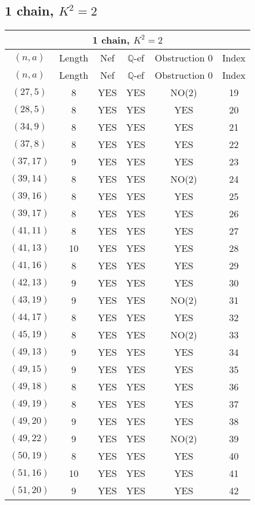 \subsection{1 chain, $K^2 = 2$}
\begin{longtable}{|c|c|c|c|c|c|}
\hline
\multicolumn{6}{|c|}{1 chain, $K^2 = 2$}\\
\hline
$(n,a)$ & Length & Nef & $\mathbb Q$-ef & Obstruction 0 & Index\\
\hline
\endfirsthead

\hline
$(n,a)$ & Length & Nef & $\mathbb Q$-ef & Obstruction 0 & Index\\
\hline
\endhead
\hline
\endfoot

$(27, 5)$ & 8 & YES & YES & NO(2) & 19\\
$(28, 5)$ & 8 & YES & YES & YES & 20\\
$(34, 9)$ & 8 & YES & YES & YES & 21\\
$(37, 8)$ & 8 & YES & YES & YES & 22\\
$(37, 17)$ & 9 & YES & YES & YES & 23\\
$(39, 14)$ & 8 & YES & YES & NO(2) & 24\\
$(39, 16)$ & 8 & YES & YES & YES & 25\\
$(39, 17)$ & 8 & YES & YES & YES & 26\\
$(41, 11)$ & 8 & YES & YES & YES & 27\\
$(41, 13)$ & 10 & YES & YES & YES & 28\\
$(41, 16)$ & 8 & YES & YES & YES & 29\\
$(42, 13)$ & 9 & YES & YES & YES & 30\\
$(43, 19)$ & 9 & YES & YES & NO(2) & 31\\
$(44, 17)$ & 8 & YES & YES & YES & 32\\
$(45, 19)$ & 8 & YES & YES & NO(2) & 33\\
$(49, 13)$ & 9 & YES & YES & YES & 34\\
$(49, 15)$ & 9 & YES & YES & YES & 35\\
$(49, 18)$ & 8 & YES & YES & YES & 36\\
$(49, 19)$ & 8 & YES & YES & YES & 37\\
$(49, 20)$ & 9 & YES & YES & YES & 38\\
$(49, 22)$ & 9 & YES & YES & NO(2) & 39\\
$(50, 19)$ & 8 & YES & YES & YES & 40\\
$(51, 16)$ & 10 & YES & YES & YES & 41\\
$(51, 20)$ & 9 & YES & YES & YES & 42\\

\end{longtable}
